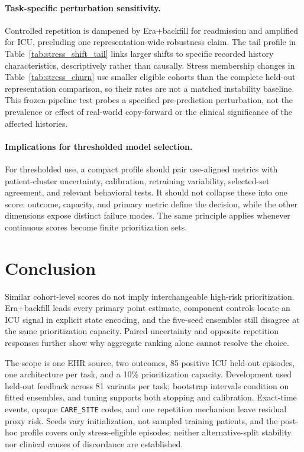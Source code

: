 \documentclass{article}
\begin{document}
\paragraph{Task-specific perturbation sensitivity.}
Controlled repetition is dampened by Era+backfill for readmission and amplified
for ICU, precluding one representation-wide robustness claim. The tail profile
in Table~\ref{tab:stress_shift_tail} links larger shifts to specific recorded
history characteristics, descriptively rather than causally. Stress membership
changes in Table~\ref{tab:stress_churn} use smaller eligible cohorts than the complete
held-out representation comparison, so their rates are not a matched
instability baseline. This frozen-pipeline test probes a specified
pre-prediction perturbation, not the prevalence or effect of real-world
copy-forward or the clinical significance of the affected histories.

\paragraph{Implications for thresholded model selection.}
For thresholded use, a compact profile should pair use-aligned metrics with
patient-cluster uncertainty, calibration, retraining variability, selected-set
agreement, and relevant behavioral tests. It should not collapse these into one
score: outcome, capacity, and primary metric define the decision, while the
other dimensions expose distinct failure modes. The same principle applies
whenever continuous scores become finite prioritization sets.

\section{Conclusion}

Similar cohort-level scores do not imply interchangeable high-risk
prioritization. Era+backfill leads every primary point estimate, component
controls locate an ICU signal in explicit state encoding, and the five-seed
ensembles still disagree at the same prioritization capacity. Paired uncertainty
and opposite repetition responses further show why aggregate ranking alone
cannot resolve the choice.

The scope is one EHR source, two outcomes, 85 positive ICU held-out episodes,
one architecture per task, and a 10\% prioritization capacity. Development used
held-out feedback across 81 variants per task; bootstrap intervals condition on fitted
ensembles, and tuning supports both stopping and calibration. Exact-time events,
opaque \texttt{CARE\_SITE} codes, and one repetition mechanism leave residual
proxy risk. Seeds vary initialization, not sampled training patients, and the
post-hoc profile covers only stress-eligible episodes; neither alternative-split
stability nor clinical causes of discordance are established.
\end{document}
